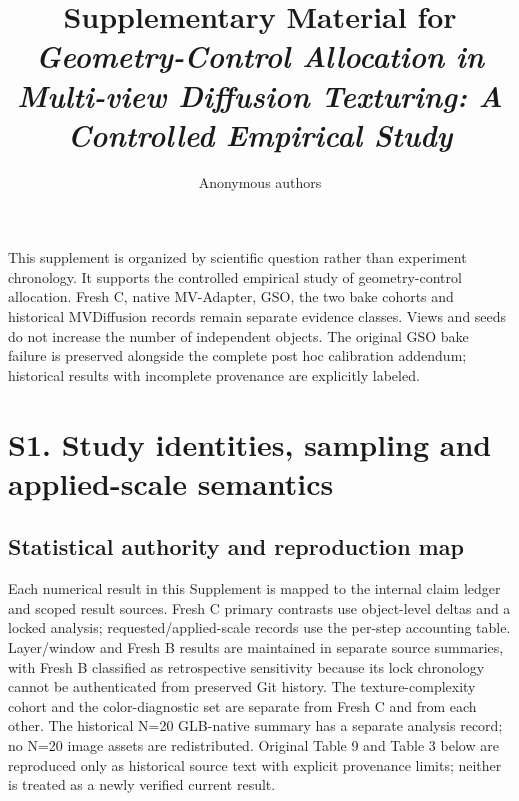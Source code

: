 \documentclass[11pt]{article}
\title{Supplementary Material for\\
\emph{Geometry-Control Allocation in Multi-view Diffusion Texturing: A Controlled Empirical Study}}
\author{Anonymous authors}
\date{}
\begin{document}
\maketitle
\noindent This supplement is organized by scientific question rather than experiment chronology. It supports the controlled empirical study of geometry-control allocation. Fresh C, native MV-Adapter, GSO, the two bake cohorts and historical MVDiffusion records remain separate evidence classes. Views and seeds do not increase the number of independent objects. The original GSO bake failure is preserved alongside the complete post hoc calibration addendum; historical results with incomplete provenance are explicitly labeled.

\tableofcontents
\clearpage
\FloatBarrier
\section*{S1. Study identities, sampling and applied-scale semantics}
\label{supp:group1}

\subsection*{Statistical authority and reproduction map}
Each numerical result in this Supplement is mapped to the internal claim ledger and scoped result sources. Fresh C primary contrasts use object-level deltas and a locked analysis; requested/applied-scale records use the per-step accounting table. Layer/window and Fresh B results are maintained in separate source summaries, with Fresh B classified as retrospective sensitivity because its lock chronology cannot be authenticated from preserved Git history. The texture-complexity cohort and the color-diagnostic set are separate from Fresh C and from each other. The historical N=20 GLB-native summary has a separate analysis record; no N=20 image assets are redistributed. Original Table 9 and Table 3 below are reproduced only as historical source text with explicit provenance limits; neither is treated as a newly verified current result.
\end{document}
